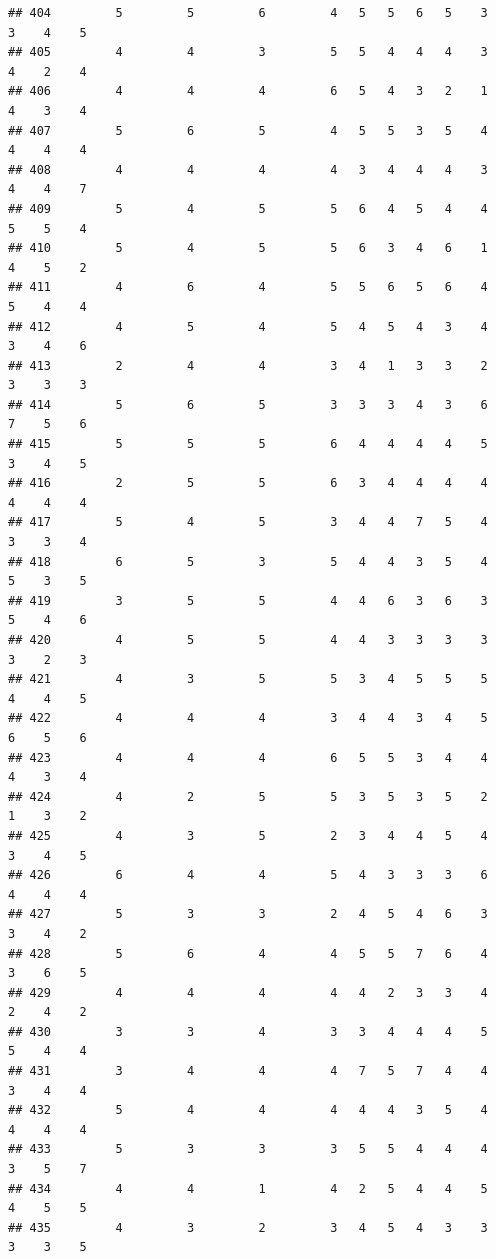 \documentclass[
]{article}
\begin{document}
\begin{verbatim}
## 404         5         5         6         4   5   5   6   5    3    3    4    5
## 405         4         4         3         5   5   4   4   4    3    4    2    4
## 406         4         4         4         6   5   4   3   2    1    4    3    4
## 407         5         6         5         4   5   5   3   5    4    4    4    4
## 408         4         4         4         4   3   4   4   4    3    4    4    7
## 409         5         4         5         5   6   4   5   4    4    5    5    4
## 410         5         4         5         5   6   3   4   6    1    4    5    2
## 411         4         6         4         5   5   6   5   6    4    5    4    4
## 412         4         5         4         5   4   5   4   3    4    3    4    6
## 413         2         4         4         3   4   1   3   3    2    3    3    3
## 414         5         6         5         3   3   3   4   3    6    7    5    6
## 415         5         5         5         6   4   4   4   4    5    3    4    5
## 416         2         5         5         6   3   4   4   4    4    4    4    4
## 417         5         4         5         3   4   4   7   5    4    3    3    4
## 418         6         5         3         5   4   4   3   5    4    5    3    5
## 419         3         5         5         4   4   6   3   6    3    5    4    6
## 420         4         5         5         4   4   3   3   3    3    3    2    3
## 421         4         3         5         5   3   4   5   5    5    4    4    5
## 422         4         4         4         3   4   4   3   4    5    6    5    6
## 423         4         4         4         6   5   5   3   4    4    4    3    4
## 424         4         2         5         5   3   5   3   5    2    1    3    2
## 425         4         3         5         2   3   4   4   5    4    3    4    5
## 426         6         4         4         5   4   3   3   3    6    4    4    4
## 427         5         3         3         2   4   5   4   6    3    3    4    2
## 428         5         6         4         4   5   5   7   6    4    3    6    5
## 429         4         4         4         4   4   2   3   3    4    2    4    2
## 430         3         3         4         3   3   4   4   4    5    5    4    4
## 431         3         4         4         4   7   5   7   4    4    3    4    4
## 432         5         4         4         4   4   4   3   5    4    4    4    4
## 433         5         3         3         3   5   5   4   4    4    3    5    7
## 434         4         4         1         4   2   5   4   4    5    4    5    5
## 435         4         3         2         3   4   5   4   3    3    3    3    5

\end{verbatim}
\end{document}
